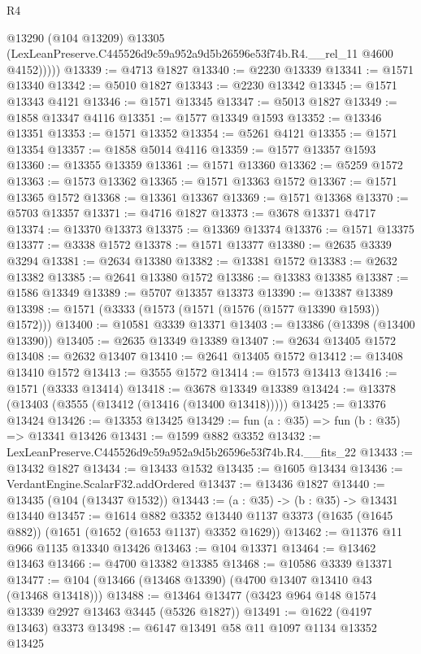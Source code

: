 \begin{lexlean}{R4}
\begin{coremodule}
            @13290
            (@104 @13209)
            @13305
            (LexLeanPreserve.C445526d9c59a952a9d5b26596e53f74b.R4.__rel_11 @4600 @4152)))))
@13339 := @4713 @1827
@13340 := @2230 @13339
@13341 := @1571 @13340
@13342 := @5010 @1827
@13343 := @2230 @13342
@13345 := @1571 @13343 @4121
@13346 := @1571 @13345
@13347 := @5013 @1827
@13349 := @1858 @13347 @4116
@13351 := @1577 @13349 @1593
@13352 := @13346 @13351
@13353 := @1571 @13352
@13354 := @5261 @4121
@13355 := @1571 @13354
@13357 := @1858 @5014 @4116
@13359 := @1577 @13357 @1593
@13360 := @13355 @13359
@13361 := @1571 @13360
@13362 := @5259 @1572
@13363 := @1573 @13362
@13365 := @1571 @13363 @1572
@13367 := @1571 @13365 @1572
@13368 := @13361 @13367
@13369 := @1571 @13368
@13370 := @5703 @13357
@13371 := @4716 @1827
@13373 := @3678 @13371 @4717
@13374 := @13370 @13373
@13375 := @13369 @13374
@13376 := @1571 @13375
@13377 := @3338 @1572
@13378 := @1571 @13377
@13380 := @2635 @3339 @3294
@13381 := @2634 @13380
@13382 := @13381 @1572
@13383 := @2632 @13382
@13385 := @2641 @13380 @1572
@13386 := @13383 @13385
@13387 := @1586 @13349
@13389 := @5707 @13357 @13373
@13390 := @13387 @13389
@13398 := @1571 (@3333 (@1573 (@1571 (@1576 (@1577 @13390 @1593)) @1572)))
@13400 := @10581 @3339 @13371
@13403 := @13386 (@13398 (@13400 @13390))
@13405 := @2635 @13349 @13389
@13407 := @2634 @13405 @1572
@13408 := @2632 @13407
@13410 := @2641 @13405 @1572
@13412 := @13408 @13410 @1572
@13413 := @3555 @1572
@13414 := @1573 @13413
@13416 := @1571 (@3333 @13414)
@13418 := @3678 @13349 @13389
@13424 := @13378 (@13403 (@3555 (@13412 (@13416 (@13400 @13418)))))
@13425 := @13376 @13424
@13426 := @13353 @13425
@13429 := fun (a : @35) => fun (b : @35) => @13341 @13426
@13431 := @1599 @882 @3352
@13432 := LexLeanPreserve.C445526d9c59a952a9d5b26596e53f74b.R4.__fits_22
@13433 := @13432 @1827
@13434 := @13433 @1532
@13435 := @1605 @13434
@13436 := VerdantEngine.ScalarF32.addOrdered
@13437 := @13436 @1827
@13440 := @13435 (@104 (@13437 @1532))
@13443 := (a : @35) -> (b : @35) -> @13431 @13440
@13457 := @1614
    @882
    @3352
    @13440
    @1137
    @3373
    (@1635 (@1645 @882))
    (@1651 (@1652 (@1653 @1137) @3352 @1629))
@13462 := @11376 @11 @966 @1135 @13340 @13426
@13463 := @104 @13371
@13464 := @13462 @13463
@13466 := @4700 @13382 @13385
@13468 := @10586 @3339 @13371
@13477 := @104 (@13466 (@13468 @13390) (@4700 @13407 @13410 @43 (@13468 @13418)))
@13488 := @13464 @13477 (@3423 @964 @148 @1574 @13339 @2927 @13463 @3445 (@5326 @1827))
@13491 := @1622 (@4197 @13463) @3373
@13498 := @6147 @13491 @58 @11 @1097 @1134 @13352 @13425

\end{coremodule}
\end{lexlean}
